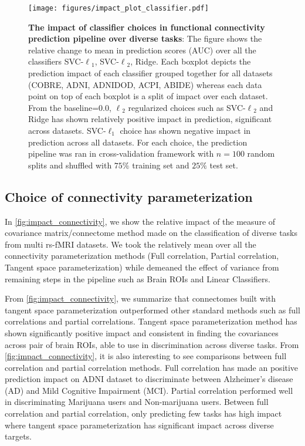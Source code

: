 \documentclass[5p]{elsarticle}
\begin{document}
\begin{figure}
    \centerline{%
    \texttt{[image: figures/impact\_plot\_classifier.pdf]}%
    }%
    \caption[choice of classifier]{\textbf{The impact of classifier
            choices in functional connectivity prediction pipeline over
            diverse tasks}:
            The figure shows the relative change to mean in prediction scores
            (AUC) over all the classifiers SVC-$\ell{_1}$, SVC-$\ell{_2}$,
            Ridge. Each boxplot depicts the prediction
            impact of each classifier grouped together for all datasets
            (COBRE, ADNI, ADNIDOD, ACPI, ABIDE) whereas each data point on top
            of each boxplot is a split of impact over each dataset.
            From the baseline=$0.0$, $\ell{_2}$ regularized choices such as
            SVC-$\ell{_2}$ and Ridge has
            shown relatively positive impact in prediction, significant
            across datasets. SVC-$\ell_{1}$ choice has shown negative impact in
            prediction across all datasets. For each choice, the prediction pipeline
            was ran in cross-validation framework with $n=100$ random splits
            and shuffled with $75\%$ training set and $25\%$ test set.
            } 
\label{fig:impact_classifier}
\end{figure}

\subsection{Choice of connectivity parameterization}
In \autoref{fig:impact_connectivity}, we show the relative impact of
the measure of covariance matrix/connectome method made on the classification
of diverse tasks from multi rs-fMRI datasets. We took the relatively mean over
all the connectivity parameterization methods (Full correlation, Partial
correlation, Tangent space parameterization) while demeaned the effect of
variance from remaining steps in the pipeline such as Brain ROIs and Linear
Classifiers.

From \autoref{fig:impact_connectivity}, we summarize that connectomes built
with tangent space parameterization outperformed other standard methods
such as full correlations and partial correlations.
Tangent space parameterization method has shown significantly positive impact
and consistent in finding the covariances across pair of brain ROIs, able
to use in discrimination across diverse tasks. From
\autoref{fig:impact_connectivity}, it is also interesting to see comparisons
between full correlation and partial correlation methods. Full correlation
has made an positive prediction impact on ADNI dataset to discriminate
between Alzheimer's disease (AD) and Mild Cognitive Impairment (MCI). Partial
correlation performed well in discriminating Marijuana users and Non-marijuana
users. Between full correlation and partial correlation, only predicting few
tasks has high impact where tangent space parameterization has significant
impact across diverse targets.
\end{document}
